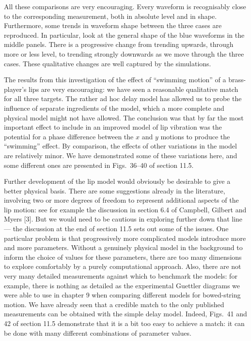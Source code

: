   All these comparisons are very encouraging. Every waveform is recognisably 
  close to the corresponding measurement, both in absolute level and in shape. 
  Furthermore, some trends in waveform shape between the three cases are 
  reproduced. In particular, look at the general shape of the blue waveforms in 
  the middle panels. There is a progressive change from trending upwards, 
  through more or less level, to trending strongly downwards as we move through 
  the three cases. These qualitative changes are well captured by the 
  simulations. 

  The results from this investigation of the effect of ``swimming motion'' of a 
  brass-player's lips are very encouraging: we have seen a reasonable 
  qualitative match for all three targets. The rather ad hoc delay model has 
  allowed us to probe the influence of separate ingredients of the model, which 
  a more complete and physical model might not have allowed. The conclusion was 
  that by far the most important effect to include in an improved model of lip 
  vibration was the potential for a phase difference between the $x$ and $y$ 
  motions to produce the ``swimming'' effect. By comparison, the effects of 
  other variations in the model are relatively minor. We have demonstrated some 
  of these variations here, and some different ones are presented in Figs.\ 
  36--40 of section 11.5. 

  Further development of the lip model would obviously be desirable to give a 
  better physical basis. There are some suggestions already in the literature, 
  involving two or more degrees of freedom to represent additional aspects of 
  the lip motion: see for example the discussion in section 6.4 of Campbell, 
  Gilbert and Myers [3]. But we would need to be cautious in exploring further 
  down that line --- the discussion at the end of section 11.5 sets out some of 
  the issues. One particular problem is that progressively more complicated 
  models introduce more and more parameters. Without a genuinely physical model 
  in the background to inform the choice of values for these parameters, there 
  are too many dimensions to explore comfortably by a purely computational 
  approach. Also, there are not very many detailed measurements against which 
  to benchmark the models: for example, there is nothing as detailed as the 
  experimental Guettler diagrams we were able to use in chapter 9 when 
  comparing different models for bowed-string motion. We have already seen that 
  a credible match to the only published measurements can be obtained with the 
  simple delay model. Indeed, Figs.\ 41 and 42 of section 11.5 demonstrate that 
  it is a bit too easy to achieve a match: it can be done with many different 
  combinations of parameter values. 

